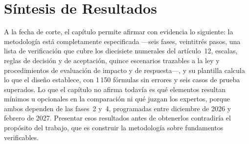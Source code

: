 \section{Síntesis de Resultados}

A la fecha de corte, el capítulo permite afirmar con evidencia lo siguiente: la metodología está completamente especificada ---seis fases, veintitrés pasos, una lista de verificación que cubre los diecisiete numerales del artículo~12, escalas, reglas de decisión y de aceptación, quince escenarios trazables a la ley y procedimientos de evaluación de impacto y de respuesta---, y su plantilla calcula lo que el diseño establece, con 1\,150 fórmulas sin errores y seis casos de prueba superados. Lo que el capítulo no afirma todavía es qué elementos resultan mínimos u opcionales en la comparación ni qué juzgan los expertos, porque ambos dependen de las fases~2 y~4, programadas entre diciembre de 2026 y febrero de 2027. Presentar esos resultados antes de obtenerlos contradiría el propósito del trabajo, que es construir la metodología sobre fundamentos verificables.
